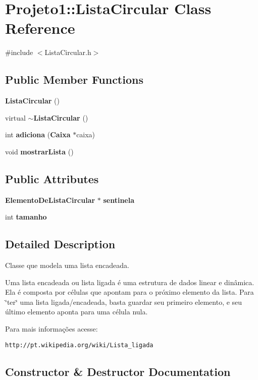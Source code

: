 \section{\-Projeto1\-:\-:\-Lista\-Circular \-Class \-Reference}
\label{classProjeto1_1_1ListaCircular}


{\ttfamily \#include $<$\-Lista\-Circular.\-h$>$}

\subsection*{\-Public \-Member \-Functions}
\begin{DoxyCompactItemize}
\item 
{\bf \-Lista\-Circular} ()
\item 
virtual {\bf $\sim$\-Lista\-Circular} ()
\item 
int {\bf adiciona} ({\bf \-Caixa} $\ast$caixa)
\item 
void {\bf mostrar\-Lista} ()
\end{DoxyCompactItemize}
\subsection*{\-Public \-Attributes}
\begin{DoxyCompactItemize}
\item 
{\bf \-Elemento\-De\-Lista\-Circular} $\ast$ {\bf sentinela}
\item 
int {\bf tamanho}
\end{DoxyCompactItemize}


\subsection{\-Detailed \-Description}
\-Classe que modela uma lista encadeada.

\-Uma lista encadeada ou lista ligada é uma estrutura de dados linear e dinâmica. \-Ela é composta por células que apontam para o próximo elemento da lista. \-Para \char`\"{}ter\char`\"{} uma lista ligada/encadeada, basta guardar seu primeiro elemento, e seu último elemento aponta para uma célula nula.\par
 \-Para mais informações acesse\-:\par
 {\tt http\-://pt.\-wikipedia.\-org/wiki/\-Lista\-\_\-ligada} 

\subsection{\-Constructor \& \-Destructor \-Documentation}
